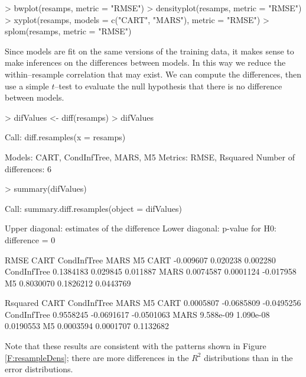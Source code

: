 \documentclass[12pt]{article}
\begin{document}
\begin{Schunk}
\begin{Sinput}
> bwplot(resamps, metric = "RMSE")
> densityplot(resamps, metric = "RMSE")
> xyplot(resamps, models = c("CART", "MARS"), metric = "RMSE")
> splom(resamps, metric = "RMSE")
\end{Sinput}
\end{Schunk}



Since models are fit on the same versions of the training data, it makes sense to make inferences on the differences between models. In this way we reduce the within--resample correlation that may exist. We can compute the differences, then use a simple $t$--test to evaluate the null hypothesis that there is no difference between models.

\begin{Schunk}
\begin{Sinput}
> difValues <- diff(resamps)
> difValues
\end{Sinput}
\begin{Soutput}
Call:
diff.resamples(x = resamps)

Models: CART, CondInfTree, MARS, M5 
Metrics: RMSE, Rsquared 
Number of differences: 6 
\end{Soutput}
\begin{Sinput}
> summary(difValues)
\end{Sinput}
\begin{Soutput}
Call:
summary.diff.resamples(object = difValues)

Upper diagonal: estimates of the difference
Lower diagonal: p-value for H0: difference = 0

RMSE 
            CART      CondInfTree MARS      M5       
CART                  -0.009607    0.020238  0.002280
CondInfTree 0.1384183              0.029845  0.011887
MARS        0.0074587 0.0001124             -0.017958
M5          0.8030070 0.1826212   0.0443769          

Rsquared 
            CART      CondInfTree MARS       M5        
CART                   0.0005807  -0.0685809 -0.0495256
CondInfTree 0.9558245             -0.0691617 -0.0501063
MARS        9.588e-09 1.090e-08               0.0190553
M5          0.0003594 0.0001707   0.1132682            
\end{Soutput}
\end{Schunk}
Note that these results are consistent with the patterns shown in
Figure \ref{F:resampleDens}; there are more differences in the $R^2$
distributions than in the error distributions.
\end{document}
